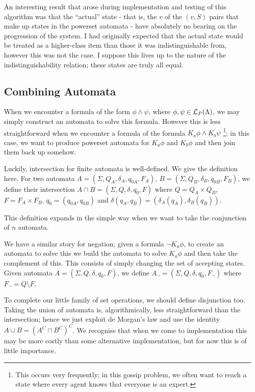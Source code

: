 \documentclass[12pt, a4paper]{article}
\begin{document}
An interesting result that arose during implementation and testing of this
algorithm was that the ``actual'' state - that is, the $v$ of the $(v, S)$ pairs
that make up states in the powerset automata - have absolutely no bearing on the
progression of the system. I had originally expected that the actual state would
be treated as a higher-class item than those it was indistinguishable from,
however this was not the case. I suppose this lives up to the nature of the
indistinguishability relation; these states are truly all equal. 

\subsection{Combining Automata}

When we encounter a formula of the form $\phi \land \psi$, where $\phi, \psi \in
\mathcal{L}_P(\Lambda)$, we may simply construct an automata to solve this formula.
However this is less straightforward when we encounter a formula of the formula
$K_a \phi \land K_b \psi$ \footnote{This occurs very frequently; in this gossip
  problem, we often want to reach a state where every agent knows that everyone
  is an expert.}; in this case, we want to produce powerset automata for $K_a
\phi$ and $K_b \phi$ and then join them back up somehow.

Luckily, intersection for finite automata is well-defined. We give the
definition here. For two automata $A = (\Sigma, Q_A, \delta_A, q_{0A}, F_A)$, $B
= (\Sigma, Q_B, \delta_B, q_{0B}, F_B)$, we define their intersection $A \cap B =
(\Sigma, Q, \delta, q_0, F)$ where $Q = Q_A \times Q_B$, $F = F_A \times F_B$,
$q_0 = (q_{0A}, q_{0B})$ and $\delta(q_A, q_B) = (\delta_A(q_A), \delta_B(q_B))$.

This definition expands in the simple way when we want to take the conjunction
of $n$ automata. 

\bigskip

We have a similar story for negation; given a formula $\neg K_a \phi$, to create
an automata to solve this we build the automata to solve $K_a \phi$ and then
take the complement of this. This consists of simply changing the set of
accepting states. Given automata $A = (\Sigma, Q, \delta, q_0, F)$, we define
$A_\neg = (\Sigma, Q, \delta, q_0, F_\neg)$ where $F_\neg = Q \setminus F$.

\bigskip

To complete our little family of set operations, we should define disjunction
too. Taking the union of automata is, algorithmically, less straightforward than
the intersection; hence we just exploit de Morgan's law and use the identity $A
\cup B = (A^C \cap B^C)^C$. We recognise that when we come to implementation
this may be more costly than some alternative implementation, but for now this
is of little importance. 
\end{document}
